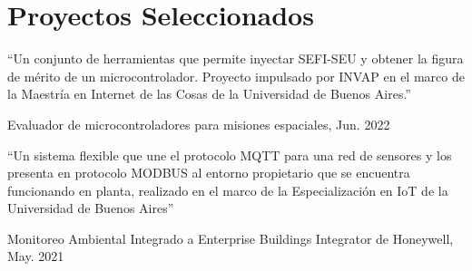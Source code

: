 \section{Proyectos Seleccionados}

\newcommand{\pub}[5]{
	\parbox[t][][t]{\linewidth}{%
		\begin{small}
		\parbox{\linewidth}{{``#4''}}
		\smallbreak
		\parbox{\linewidth}{{#2}, {#1}}
		\parbox{\linewidth}{{\href{https://doi.org/#3}{#3}}}
		\end{small}
	}
	\bigbreak
	\smallskip
}

\pub{Jun. 2022}{Evaluador de microcontroladores para misiones espaciales}{}{Un conjunto de herramientas que permite inyectar SEFI-SEU y obtener la figura de mérito de un microcontrolador. Proyecto impulsado por INVAP en el marco de la Maestría en Internet de las Cosas de la Universidad de Buenos Aires.}{
}

\pub{May. 2021}{Monitoreo Ambiental Integrado a Enterprise Buildings Integrator de Honeywell}{}{Un sistema flexible que une el protocolo MQTT para una red de sensores y los presenta en protocolo MODBUS al entorno propietario que se encuentra funcionando en planta, realizado en el marco de la Especialización en IoT de la Universidad de Buenos Aires}{
}


